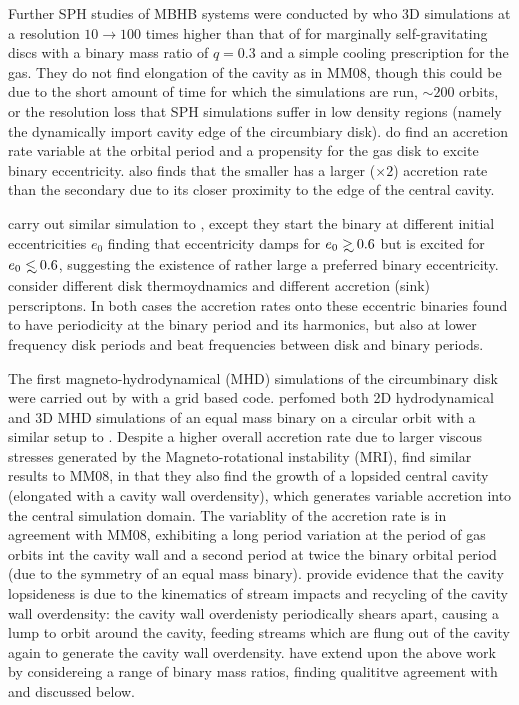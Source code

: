 Further SPH studies of MBHB systems were conducted by \citep{Cuadra:2009} who
3D simulations at a resolution $10 \rightarrow 100$ times higher than that of
\cite{Haysaki:2007} for marginally self-gravitating discs with a binary mass
ratio of $q=0.3$ and a simple cooling prescription for the gas. They do not
find elongation of the cavity as in MM08, though this could be due to the
short amount of time for which the simulations are run, $\sim 200$ orbits, or
the resolution loss that SPH simulations suffer in low density regions (namely
the dynamically import cavity edge of the circumbiary disk).
\citep{Cuadra:2009} do find an accretion rate variable at the orbital period
and a propensity for the gas disk to excite binary eccentricity.
\citep{Cuadra:2009} also finds that the smaller has a larger ($\times 2$)
accretion rate than the secondary due to its closer proximity to the edge of
the central cavity.


\citep{Roedig:2011:trqs} carry out similar simulation to \citep{Cuadra:2009}, except they start the binary at different initial eccentricities $e_0$ finding that eccentricity damps for $e_0 \gsim 0.6$ but is excited for $e_0 \lsim 0.6$, suggesting the existence of rather large a preferred binary eccentricity. \citep{Roedig2012:eccevo} consider different disk thermoydnamics and different accretion (sink) perscriptons. In both cases the accretion rates onto these eccentric binaries  found to have periodicity at the binary period and its harmonics, but also at lower frequency disk periods and beat frequencies between disk and binary periods.


The first magneto-hydrodynamical (MHD) simulations of the circumbinary disk
were carried out by \cite{ShiKrolik:2012} with a grid based code.
\cite{ShiKrolik:2012}  perfomed both 2D hydrodynamical and 3D MHD simulations
of an equal mass binary on a circular orbit with a similar setup to
\citep{MacFadyen:2008}. Despite a higher overall accretion rate due to larger
viscous stresses generated by the Magneto-rotational instability (MRI),
\cite{ShiKrolik:2012} find similar results to MM08, in that they also find the
growth of a lopsided central cavity (elongated with a cavity wall
overdensity), which generates variable accretion into the central simulation
domain. The variablity of the accretion rate is in agreement with MM08,
exhibiting a long period variation at the period of gas orbits int the cavity
wall and a second period at twice the binary orbital period (due to the
symmetry of an equal mass binary). \cite{ShiKrolik:2012} provide evidence that
the cavity lopsideness is due to the kinematics of stream impacts and
recycling of the cavity wall overdensity: the cavity wall overdenisty
periodically shears apart, causing a lump to orbit around the cavity, feeding
streams which are flung out of the cavity again to generate the cavity wall
overdensity. \cite{ShiKrolik:2015} have extend upon the above work by
considereing a range of binary mass ratios, finding qualititve agreement with
\cite{DHM:2013:MNRAS} and \cite{Farris:2014} discussed below.

